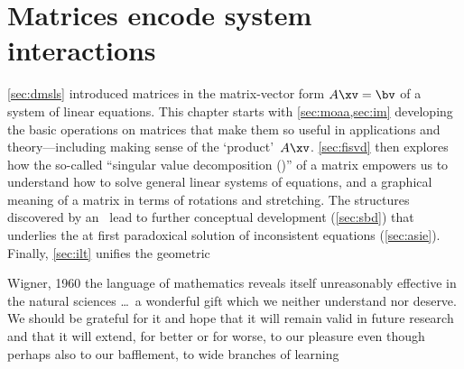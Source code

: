 
\chapter{Matrices encode system interactions}
\label{ch:m}

\minitoc




\cref{sec:dmsls} introduced matrices in the matrix-vector form \(A\xv=\bv\) of a system of linear equations.
This chapter starts with \cref{sec:moaa,sec:im} developing the basic operations on matrices that make them so useful in applications and theory---including making sense of the `product'~\(A\xv\).
\cref{sec:fisvd} then explores how the so-called ``singular value decomposition (\svd)'' of a matrix empowers us to understand how to solve general linear systems of equations, and a graphical meaning of a matrix in terms of rotations and stretching.
The structures discovered by an \svd\ lead to further conceptual development (\cref{sec:sbd}) that underlies the at first paradoxical solution of inconsistent equations (\cref{sec:asie}).
Finally, \cref{sec:ilt} unifies the geometric 



\begin{quoted}{Wigner, 1960 \cite[p.3]{Mandelbrot1982}}
the language of mathematics reveals itself unreasonably effective in the natural sciences \ldots\ a wonderful gift which we neither understand nor deserve.  We should be grateful for it and hope that it will remain valid in future research and that it will extend, for better or for worse, to our pleasure even though perhaps also to our bafflement, to wide branches of learning
\end{quoted}


